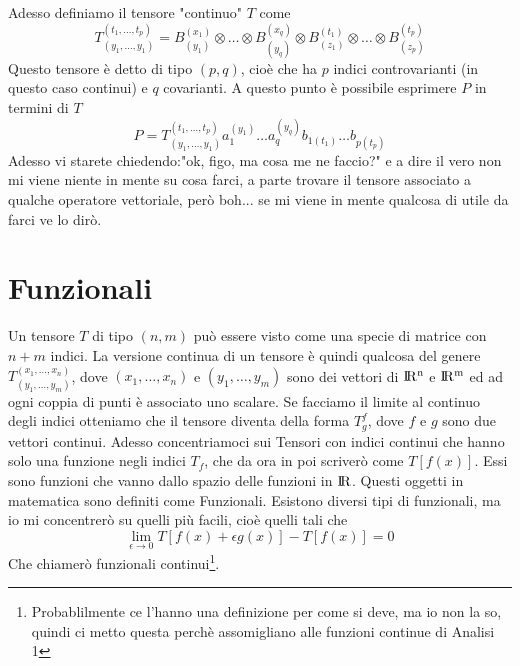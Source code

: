 \documentclass[11pt,a4paper]{report}
\theoremstyle{definition}
\theoremstyle{plain}
\theoremstyle{plain}
\begin{document}
			Adesso definiamo il tensore "continuo" $T$ come
			\begin{equation}
				T_{(y_1,\dots,y_1)}^{(t_1,\dots,t_p)}=B^{(x_1)}_{(y_1)}\otimes\dots\otimes B^{(x_q)}_{(y_q)}\otimes B_{(z_1)}^{(t_1)}\otimes\dots\otimes B_{(z_p)}^{(t_p)}
			\end{equation}
			Questo tensore è detto di tipo $(p,q)$, cioè che ha $p$ indici controvarianti (in questo caso continui) e $q$ covarianti.\newline
			A questo punto è possibile esprimere $P$ in termini di $T$
			\begin{equation}
			\label{eq:tens-cont-vett}
				P=T_{(y_1,\dots,y_1)}^{(t_1,\dots,t_p)}a_1^{(y_1)}\dots a_q^{(y_q)}b_{1(t_1)}\dots b_{p(t_p)}
			\end{equation}
			Adesso vi starete chiedendo:"ok, figo, ma cosa me ne faccio?" e a dire il vero non mi viene niente in mente su cosa farci, a parte trovare il tensore associato a qualche operatore vettoriale, però boh... se mi viene in mente qualcosa di utile da farci ve lo dirò.



		\section{Funzionali}
			Un tensore $T$ di tipo $(n,m)$ può essere visto come una specie di matrice con $n+m$ indici. La versione continua di un tensore è quindi qualcosa del genere $T^{(x_1,\dots,x_n)}_{(y_1,\dots,y_m)}$, dove $(x_1,\dots,x_n)$ e $(y_1,\dots,y_m)$ sono dei vettori di $\rm I\!R^n$ e $\rm I\!R^m$ ed ad ogni coppia di punti è associato uno scalare.\newline
			Se facciamo il limite al continuo degli indici otteniamo che il tensore diventa della forma $T^{f}_{g}$, dove $f$ e $g$ sono due vettori continui.\newline
			Adesso concentriamoci sui Tensori con indici continui che hanno solo una funzione negli indici $T_f$, che da ora in poi scriverò come $T[f(x)]$. Essi sono funzioni che vanno dallo spazio delle funzioni in $\rm I\!R$. Questi oggetti in matematica sono definiti come Funzionali.\newline
			Esistono diversi tipi di funzionali, ma io mi concentrerò su quelli più facili, cioè quelli tali che
			\begin{equation}
				\lim_{\epsilon 	\to 0}T[f(x)+\epsilon g(x)]-T[f(x)]=0
			\end{equation}
			Che chiamerò funzionali continui\footnote{Probablilmente ce l'hanno una definizione per come si deve, ma io non la so, quindi ci metto questa perchè assomigliano alle funzioni continue di Analisi 1}.
\end{document}
